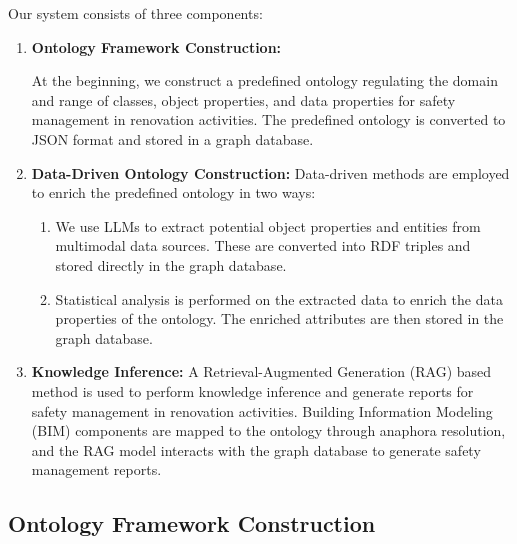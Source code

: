 Our system consists of three components: 
\begin{enumerate}
    \item \textbf{Ontology Framework Construction:}
    
    At the beginning, we construct a predefined ontology regulating the domain and range of classes, object properties, and data properties for safety management in renovation activities.
    The predefined ontology is converted to JSON format and stored in a graph database. 
    
    \item \textbf{Data-Driven Ontology Construction:}
    Data-driven methods are employed to enrich the predefined ontology in two ways:
    \begin{enumerate}
        \item We use LLMs to extract potential object properties and entities from multimodal data sources. These are converted into RDF triples and stored directly in the graph database.
        \item Statistical analysis is performed on the extracted data to enrich the data properties of the ontology. The enriched attributes are then stored in the graph database.
    \end{enumerate}
    \item \textbf{Knowledge Inference:}
    A Retrieval-Augmented Generation (RAG) based method is used to perform knowledge inference and 
    generate reports for safety management in renovation activities. 
    Building Information Modeling (BIM) components are mapped to the ontology through anaphora resolution, 
    and the RAG model interacts with the graph database to generate safety management reports.
\end{enumerate}
\subsection*{Ontology Framework Construction}
\label{sec:ontology_coarse}
